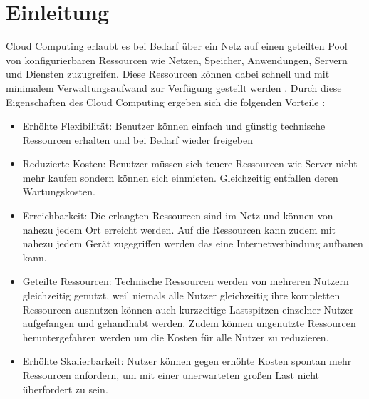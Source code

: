 \section{Einleitung}


Cloud Computing erlaubt es bei Bedarf über ein Netz auf einen geteilten Pool von konfigurierbaren Ressourcen wie Netzen, Speicher, Anwendungen, Servern und Diensten zuzugreifen. Diese Ressourcen können dabei schnell und mit minimalem Verwaltungsaufwand zur Verfügung gestellt werden \cite{mell2011}. 
Durch diese Eigenschaften des Cloud Computing ergeben sich die folgenden Vorteile \cite{ganesh2014}:
\begin{itemize}
\item 
Erhöhte Flexibilität: Benutzer können einfach und günstig technische Ressourcen erhalten und bei Bedarf wieder freigeben
\item
Reduzierte Kosten: Benutzer müssen sich teuere Ressourcen wie Server nicht mehr kaufen sondern können sich einmieten. Gleichzeitig entfallen deren Wartungskosten. 
\item
Erreichbarkeit: Die erlangten Ressourcen sind im Netz und können von nahezu jedem Ort erreicht werden. Auf die Ressourcen kann zudem mit nahezu jedem Gerät zugegriffen werden das eine Internetverbindung aufbauen kann.
\item
Geteilte Ressourcen: Technische Ressourcen werden von mehreren Nutzern gleichzeitig genutzt, weil niemals alle Nutzer gleichzeitig ihre kompletten Ressourcen ausnutzen können auch kurzzeitige Lastspitzen einzelner Nutzer aufgefangen und gehandhabt werden. Zudem können ungenutzte Ressourcen heruntergefahren werden um die Kosten für alle Nutzer zu reduzieren.
\item
Erhöhte Skalierbarkeit: Nutzer können gegen erhöhte Kosten spontan mehr Ressourcen anfordern, um mit einer unerwarteten großen Last nicht überfordert zu sein.
\end{itemize}

